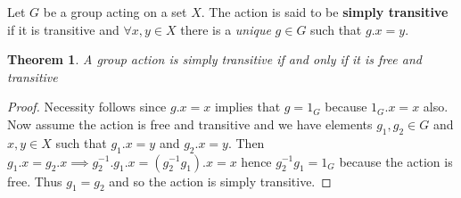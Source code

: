 \documentclass[12pt]{article}
\theoremstyle{plain}
\newtheorem*{theorem}{Theorem}
\begin{document}
Let $G$ be a group acting on a set $X$. The action is said to be \textbf{simply transitive} if it is transitive and $\forall x,y \in X$ there is a \emph{unique} $g \in G$ such that $g.x = y$.


\begin{theorem}
A group action is simply transitive if and only if it is free and transitive
\end{theorem}

\begin{proof}
Necessity follows since $g.x = x$ implies that $g = 1_G$ because $1_G.x = x$ also. Now assume the action is free and transitive and we have elements $g_1, g_2 \in G$ and $x,y \in X$ such that $g_1.x = y$ and $g_2.x = y$. Then $g_1.x = g_2.x \implies g_2^{-1}.g_1.x = (g_2^{-1} g_1).x = x$ hence $g_2^{-1} g_1 = 1_G$ because the action is free. Thus $g_1 = g_2$ and so the action is simply transitive.
\end{proof}
\end{document}
